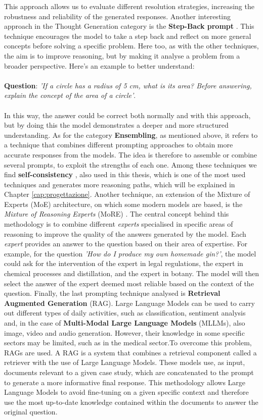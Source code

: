 This approach allows us to evaluate different resolution strategies, increasing the robustness and reliability of the generated responses. Another interesting approach in the Thought Generation category is the \textbf{Step-Back prompt} \cite{Stepback}.
This technique encourages the model to take a step back and reflect on more general concepts before solving a specific problem. Here too, as with the other techniques, the aim is to improve reasoning, but by making it analyse a problem from a broader perspective.
Here's an example to better understand:\\
\\
\textbf{Question}: \textit{'If a circle has a radius of 5 cm, what is its area? Before answering, explain the concept of the area of a circle'}.\\
\\
In this way, the answer could be correct both normally and with this approach, but by doing this the model demonstrates a deeper and more structured understanding.
As for the category \textbf{Ensembling}, as mentioned above, it refers to a technique that combines different prompting approaches to obtain more accurate responses from the models. 
The idea is therefore to assemble or combine several prompts, to exploit the strengths of each one. Among these techniques we find \textbf{self-consistency} \cite{SC}, also used in this thesis, which is one of the most used techniques and generates more reasoning paths, which will be explained in Chapter \ref{cap:progettazione}.
Another technique, an extension of the Mixture of Experts (MoE) \cite{MoE} architecture, on which some modern models are based, is the \textit{Mixture of Reasoning Experts} (MoRE) \cite{MoRE}.
The central concept behind this methodology is to combine different \textit{experts} specialised in specific areas of reasoning to improve the quality of the answers generated by the model.
Each \textit{expert} provides an answer to the question based on their area of expertise.
For example, for the question \textit{'How do I produce my own homemade gin?'},  the model could ask for the intervention of the expert in legal regulations, the expert in chemical processes and distillation, and the expert in botany. The model will then select the answer of the expert deemed most reliable based on the context of the question.
Finally, the last prompting technique analysed is \textbf{Retrieval Augmented Generation }(RAG)\cite{Rag}.
Large Language Models can be used to carry out different types of daily activities, such as classification, sentiment analysis and, in the case of \textbf{Multi-Modal Large Language Models} (MLLMs)\cite{Yin_2024}, also image, video and audio generation. However, their knowledge in some specific sectors may be limited, such as in the medical sector.To overcome this problem, RAGs are used. A RAG is a system that combines a retrieval component called a retriever with the use of Large Language Models. These models use, as input, documents relevant to a given case study, which are concatenated to the prompt to generate a more informative final response. This methodology allows Large Language Models to avoid fine-tuning on a given specific context and therefore use the most up-to-date knowledge contained within the documents to answer the original question.

